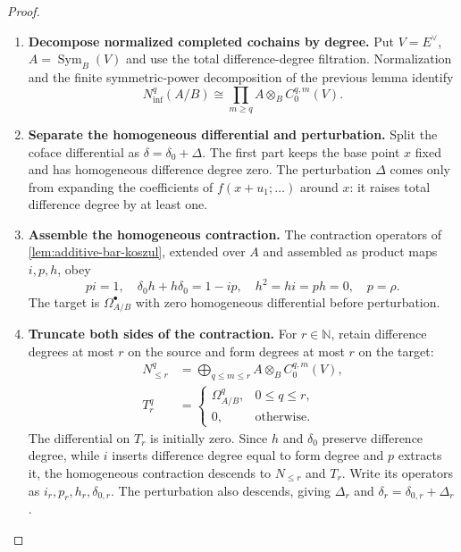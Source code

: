 \documentclass[11pt,a4paper]{article}
\numberwithin{algorithm}{section}
\numberwithin{equation}{section}
\theoremstyle{definition}
\theoremstyle{remark}
\theoremstyle{plain}
\newcommand{\N}{\mathbb N}
\newcommand{\Sym}{\operatorname{Sym}}
\theoremstyle{definition}
\theoremstyle{plain}
\begin{document}
\begin{proof}\leavevmode
\begin{enumerate}[leftmargin=*,align=left]
\item \textbf{Decompose normalized completed cochains by degree.}
Put $V=E^\vee$, $A=\Sym_B(V)$ and use the total difference-degree
filtration.  Normalization and the finite symmetric-power
decomposition of the previous lemma identify
\[
 N^q_{\mathrm{inf}}(A/B)
 \cong\prod_{m\ge q} A\otimes_BC^{q,m}_0(V).
\]

\item \textbf{Separate the homogeneous differential and perturbation.}
Split the coface differential as
$\delta=\delta_0+\Delta$.  The first part keeps the base point
$x$ fixed and has homogeneous difference degree zero.  The
perturbation $\Delta$ comes only from expanding the coefficients
of $f(x+u_1;\ldots)$ around $x$: it raises total difference degree
by at least one.

\item \textbf{Assemble the homogeneous contraction.}
The contraction operators of
\cref{lem:additive-bar-koszul}, extended over $A$ and assembled
as product maps $i,p,h$, obey
\[
 pi=1,\quad\delta_0h+h\delta_0=1-ip,\quad
 h^2=hi=ph=0,\quad p=\rho.
\]
The target is $\Omega^\bullet_{A/B}$ with zero homogeneous
differential before perturbation.

\item \textbf{Truncate both sides of the contraction.}
For $r\in\N$, retain difference degrees at most $r$ on
the source and form degrees at most $r$ on the target:
\begin{equation}\label{eq:finite-derham-truncations}
 \begin{aligned}
 N_{\le r}^q
   &=\bigoplus_{q\le m\le r}A\otimes_BC^{q,m}_0(V),\\
 T_r^q&=\begin{cases}
       \Omega^q_{A/B},&0\le q\le r,\\
       0,&\text{otherwise}.
       \end{cases}
 \end{aligned}
\end{equation}
The differential on $T_r$ is initially zero. Since $h$ and
$\delta_0$ preserve difference degree, while $i$ inserts
difference degree equal to form degree and $p$ extracts it,
the homogeneous contraction descends to $N_{\le r}$ and $T_r$.
Write its operators as $i_r,p_r,h_r,\delta_{0,r}$. The
perturbation also descends, giving $\Delta_r$ and
$\delta_r=\delta_{0,r}+\Delta_r$.


\end{enumerate}
\end{proof}
\end{document}
